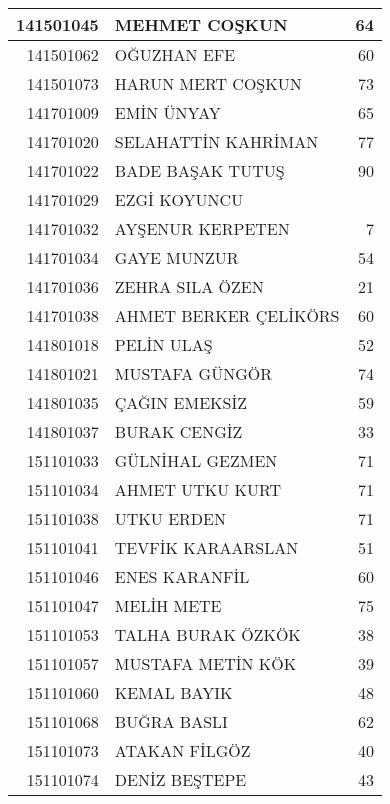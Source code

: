 \documentclass[12pt]{article}
\begin{document}
\begin{longtable}{||r||l||r||}
    \midrule
    141501045 & MEHMET COŞKUN & 64 \\
    \midrule
    141501062 & OĞUZHAN EFE & 60 \\
    \midrule
    141501073 & HARUN MERT COŞKUN & 73 \\
    \midrule
    141701009 & EMİN ÜNYAY & 65 \\
    \midrule
    141701020 & SELAHATTİN KAHRİMAN & \cellcolor[rgb]{ 1,  1,  0} 77 \\
    \midrule
    141701022 & BADE BAŞAK TUTUŞ & 90 \\
    \midrule
    141701029 & EZGİ KOYUNCU &  \\
    \midrule
    141701032 & AYŞENUR KERPETEN & 7 \\
    \midrule
    141701034 & GAYE MUNZUR & 54 \\
    \midrule
    141701036 & ZEHRA SILA ÖZEN & 21 \\
    \midrule
    141701038 & AHMET BERKER ÇELİKÖRS & \cellcolor[rgb]{ 1,  1,  0} 60 \\
    \midrule
    141801018 & PELİN ULAŞ & 52 \\
    \midrule
    141801021 & MUSTAFA GÜNGÖR & 74 \\
    \midrule
    141801035 & ÇAĞIN EMEKSİZ & 59 \\
    \midrule
    141801037 & BURAK CENGİZ & \cellcolor[rgb]{ 1,  1,  0} 33 \\
    \midrule
    151101033 & GÜLNİHAL GEZMEN & 71 \\
    \midrule
    151101034 & AHMET UTKU KURT & 71 \\
    \midrule
    151101038 & UTKU ERDEN & 71 \\
    \midrule
    151101041 & TEVFİK KARAARSLAN & 51 \\
    \midrule
    151101046 & ENES KARANFİL & 60 \\
    \midrule
    151101047 & MELİH METE & 75 \\
    \midrule
    151101053 & TALHA BURAK ÖZKÖK & 38 \\
    \midrule
    151101057 & MUSTAFA METİN KÖK & \cellcolor[rgb]{ 1,  1,  0} 39 \\
    \midrule
    151101060 & KEMAL BAYIK & 48 \\
    \midrule
    151101068 & BUĞRA BASLI & 62 \\
    \midrule
    151101073 & ATAKAN FİLGÖZ & 40 \\
    \midrule
    151101074 & DENİZ BEŞTEPE & 43 \\
    \midrule

\end{longtable}
\end{document}
